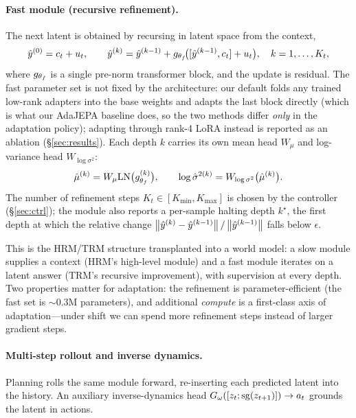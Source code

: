\paragraph{Fast module (recursive refinement).} The next latent is obtained by recursing in
latent space from the context,
\begin{equation}
\hat{y}^{(0)} = c_t + u_t,\qquad
\hat{y}^{(k)} = \hat{y}^{(k-1)} + g_{\theta_f}\!\big([\hat{y}^{(k-1)},c_t] + u_t\big),\quad k = 1,\dots,K_t,
\label{eq:refine}
\end{equation}
where $g_{\theta_f}$ is a single pre-norm transformer block, and the update is residual. The fast
parameter set is not fixed by the architecture: our default folds any trained low-rank
adapters into the base weights and adapts the last block directly (which is what our
AdaJEPA baseline does, so the two methods differ \emph{only} in the adaptation policy);
adapting through rank-4 LoRA instead is reported as an ablation (\S\ref{sec:results}). Each depth $k$ carries its own mean head $W_\mu$ and log-variance head $W_{\log\sigma^2}$:
\begin{equation}
\hat\mu^{(k)} = W_\mu \mathrm{LN}\big(g_{\theta_f}^{(k)}\big),\qquad
\log\hat\sigma^{2(k)} = W_{\log\sigma^2}\big(\hat\mu^{(k)}\big).
\end{equation}
The number of refinement steps $K_t\in[K_{\min},K_{\max}]$ is chosen by the controller
(\S\ref{sec:ctrl}); the module also reports a per-sample halting depth $k^\star$, the first
depth at which the relative change $\left\lVert \hat{y}^{(k)}-\hat{y}^{(k-1)} \right\rVert/\left\lVert \hat{y}^{(k-1)} \right\rVert$
falls below $\epsilon$.

This is the HRM/TRM structure transplanted into a world model: a slow module supplies a
context (HRM's high-level module) and a fast module iterates on a latent answer (TRM's
recursive improvement), with supervision at every depth. Two properties matter for
adaptation: the refinement is parameter-efficient (the fast set is $\sim$0.3M parameters), and
additional \emph{compute} is a first-class axis of adaptation---under shift we can spend more
refinement steps instead of larger gradient steps.

\paragraph{Multi-step rollout and inverse dynamics.} Planning rolls the same module forward,
re-inserting each predicted latent into the history. An auxiliary inverse-dynamics head
$G_\omega([z_t;\mathrm{sg}(z_{t+1})])\to a_t$ grounds the latent in actions.

